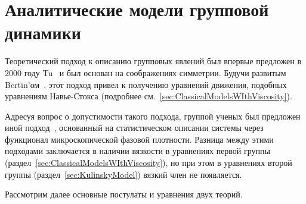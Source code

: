 \chapter{Аналитические модели групповой динамики}
\label{ch:TheoreticalModels}

Теоретический подход к описанию групповых явлений был впервые предложен в 2000 году Tu~\cite{tu2000} и был основан на соображениях симметрии. Будучи развитым Bertin'ом~\cite{bertin2006}, этот подход привел к получению уравнений движения, подобных уравнениям Навье-Стокса (подробнее см.~\ref{sec:ClassicalModelsWIthViscosity}).

Адресуя вопрос о допустимости такого подхода, группой ученых был предложен иной подход~\cite{ratushnaya2007,chepizhko2013}, основанный на статистическом описании системы через функционал микроскопической фазовой плотности. Разница между этими подходами заключается в наличии вязкости в уравнениях первой группы (раздел~\ref{sec:ClassicalModelsWIthViscosity}), но при этом в уравнениях второй группы (раздел~\ref{sec:KulinskyModel}) вязкий член не появляется.

Рассмотрим далее основные постулаты и уравнения двух теорий.




